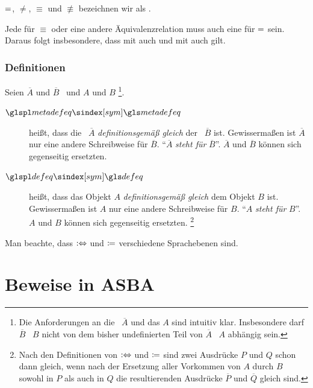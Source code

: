 $=$, $\ne$, $\equiv$ und $\nequiv$ bezeichnen wir als  .

Jede  für $\equiv$ oder eine andere Äquivalenzrelation muss auch eine für $=$ sein.
Daraus folgt insbesondere, dass mit  auch  und mit  auch  gilt.

\subsubsection{Definitionen}%
\label{subsub:Definitionen}

{
	\newcommand*{\A}{\overline{A}}
	\newcommand*{\B}{\overline{B}}
	Seien $\A$ und $\B$ \Aussagen\ und $A$ und $B$ %
	\footnote{%
		Die Anforderungen an die \Aussage\ $\A$ und das  $A$ sind intuitiv klar.
		Insbesondere darf $\B$ \textbzw\ $B$ nicht von dem bisher undefinierten Teil von $\A$ \textbzw\ $A$ abhängig sein.
	}.
	\begin{description}
		\item[$\glsSym{metadefeq}$~\emph{}]\label{def:Metadefinition}
		\seqqt{$\A \metadefeq \B$} heißt, dass die \Aussage\ $\A$ \emph{definitionsgemäß gleich} der \Aussage\ $\B$ ist.
		Gewissermaßen ist $\A$ nur eine andere Schreibweise für $\B$.
		\enquote{$\A$ \emph{steht für} $\B$}.
		$\A$ und $\B$ können sich gegenseitig ersetzten.
		\item[$\glsSym{defeq}$~\emph{}]\label{def:Definition}
		 heißt, dass das Objekt $A$ \emph{definitionsgemäß gleich} dem Objekt $B$ ist.
		Gewissermaßen ist $A$ nur eine andere Schreibweise für $B$.
		\enquote{$A$ \emph{steht für} $B$}.
		$A$ und $B$ können sich gegenseitig ersetzten.%
		\footnote{%
			Nach den Definitionen von $:\Leftrightarrow$ und $\coloneqq$ sind zwei Ausdrücke $P$ und $Q$ schon dann gleich, wenn nach der Ersetzung aller Vorkommen von $A$ durch $B$ sowohl in $P$ als auch in $Q$ die resultierenden Ausdrücke $\overline{P}$ und $\overline{Q}$ gleich sind.
		}

	\end{description}
	Man beachte, dass $:\Leftrightarrow$ und $\coloneqq$ verschiedene Sprachebenen sind.
}

\section{Beweise in ASBA}%
\label{sec:BeweiseASBA}

